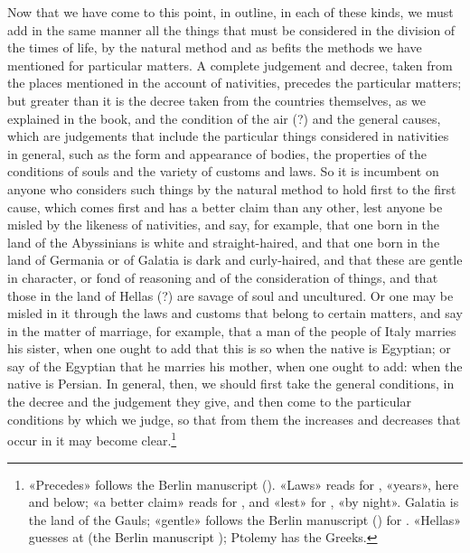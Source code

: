 \documentclass[11pt]{article}
\begin{document}
\par Now that we have come to this point, in outline, in each of these kinds, we must add in the same manner all the things that must be considered in the division of the times of life, by the natural method and as befits the methods we have mentioned for particular matters. A complete judgement and decree, taken from the places mentioned in the account of nativities, precedes the particular matters; but greater than it is the decree taken from the countries themselves, as we explained in the book, and the condition of the air (?) and the general causes, which are judgements that include the particular things considered in nativities in general, such as the form and appearance of bodies, the properties of the conditions of souls and the variety of customs and laws. So it is incumbent on anyone who considers such things by the natural method to hold first to the first cause, which comes first and has a better claim than any other, lest anyone be misled by the likeness of nativities, and say, for example, that one born in the land of the Abyssinians is white and straight-haired, and that one born in the land of Germania or of Galatia is dark and curly-haired, and that these are gentle in character, or fond of reasoning and of the consideration of things, and that those in the land of Hellas (?) are savage of soul and uncultured. Or one may be misled in it through the laws and customs that belong to certain matters, and say in the matter of marriage, for example, that a man of the people of Italy marries his sister, when one ought to add that this is so when the native is Egyptian; or say of the Egyptian that he marries his mother, when one ought to add: when the native is Persian. In general, then, we should first take the general conditions, in the decree and the judgement they give, and then come to the particular conditions by which we judge, so that from them the increases and decreases that occur in it may become clear.\footnote{«Precedes» follows the Berlin manuscript (). «Laws» reads  for , «years», here and below; «a better claim» reads  for , and «lest»  for , «by night». Galatia is the land of the Gauls; «gentle» follows the Berlin manuscript () for . «Hellas» guesses at  (the Berlin manuscript ); Ptolemy has the Greeks.}\par
\end{document}

